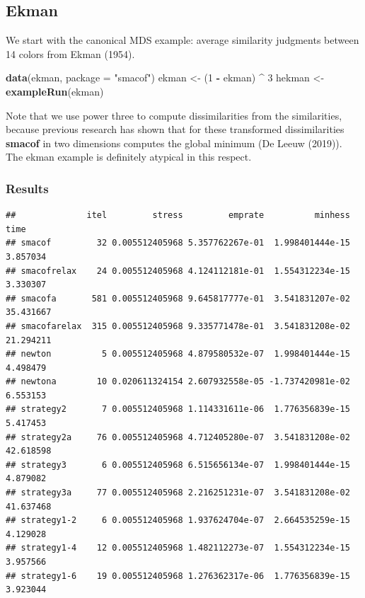 \documentclass[
  12pt,
]{article}
\newenvironment{Shaded}{\begin{snugshade}}{\end{snugshade}}
\newcommand{\AttributeTok}[1]{\textcolor[rgb]{0.13,0.29,0.53}{#1}}
\newcommand{\DecValTok}[1]{\textcolor[rgb]{0.00,0.00,0.81}{#1}}
\newcommand{\FunctionTok}[1]{\textcolor[rgb]{0.13,0.29,0.53}{\textbf{#1}}}
\newcommand{\NormalTok}[1]{#1}
\newcommand{\OtherTok}[1]{\textcolor[rgb]{0.56,0.35,0.01}{#1}}
\newcommand{\SpecialCharTok}[1]{\textcolor[rgb]{0.81,0.36,0.00}{\textbf{#1}}}
\newcommand{\StringTok}[1]{\textcolor[rgb]{0.31,0.60,0.02}{#1}}
\begin{document}
\subsection{Ekman}\label{ekman}

We start with the canonical MDS example: average similarity judgments between 14 colors from Ekman (1954).

\begin{Shaded}
\begin{Highlighting}[]
\FunctionTok{data}\NormalTok{(ekman, }\AttributeTok{package =} \StringTok{"smacof"}\NormalTok{)}
\NormalTok{ekman }\OtherTok{\textless{}{-}}\NormalTok{ (}\DecValTok{1} \SpecialCharTok{{-}}\NormalTok{ ekman) }\SpecialCharTok{\^{}} \DecValTok{3}
\NormalTok{hekman }\OtherTok{\textless{}{-}} \FunctionTok{exampleRun}\NormalTok{(ekman)}
\end{Highlighting}
\end{Shaded}

Note that we use power three to compute dissimilarities from the similarities, because previous research has shown that for these transformed dissimilarities \textbf{smacof} in two dimensions computes the global minimum (De Leeuw (2019)). The ekman example is definitely atypical in this respect.

\subsubsection{Results}\label{results-1}

\begin{Shaded}
\end{Shaded}

\begin{verbatim}
##              itel         stress         emprate          minhess      time
## smacof         32 0.005512405968 5.357762267e-01  1.998401444e-15  3.857034
## smacofrelax    24 0.005512405968 4.124112181e-01  1.554312234e-15  3.330307
## smacofa       581 0.005512405968 9.645817777e-01  3.541831207e-02 35.431667
## smacofarelax  315 0.005512405968 9.335771478e-01  3.541831208e-02 21.294211
## newton          5 0.005512405968 4.879580532e-07  1.998401444e-15  4.498479
## newtona        10 0.020611324154 2.607932558e-05 -1.737420981e-02  6.553153
## strategy2       7 0.005512405968 1.114331611e-06  1.776356839e-15  5.417453
## strategy2a     76 0.005512405968 4.712405280e-07  3.541831208e-02 42.618598
## strategy3       6 0.005512405968 6.515656134e-07  1.998401444e-15  4.879082
## strategy3a     77 0.005512405968 2.216251231e-07  3.541831208e-02 41.637468
## strategy1-2     6 0.005512405968 1.937624704e-07  2.664535259e-15  4.129028
## strategy1-4    12 0.005512405968 1.482112273e-07  1.554312234e-15  3.957566
## strategy1-6    19 0.005512405968 1.276362317e-06  1.776356839e-15  3.923044
\end{verbatim}
\end{document}
